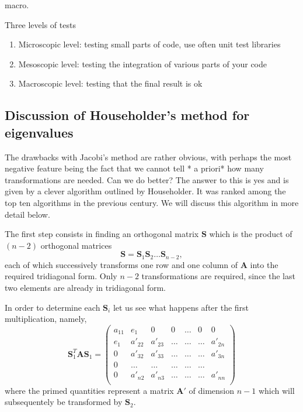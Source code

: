 \documentclass[%
oneside,                 %
final,                   %
10pt]{article}
\begin{document}
macro.

Three levels of tests
\begin{enumerate}
\item Microscopic level: testing small parts of code, use often unit test libraries

\item Mesoscopic level: testing the integration of various parts  of your code

\item Macroscopic level: testing that the final result is ok
\end{enumerate}

\noindent
\subsection*{Discussion of Householder's method for eigenvalues}

The drawbacks with Jacobi's method are rather obvious, with perhaps the most negative feature being the fact that we cannot tell * a priori* how many transformations are needed. Can we do better?  
The answer to this is yes and is given by a clever algorithm outlined by Householder. It was ranked among the top ten algorithms in the previous century.  We will discuss this algorithm in more detail below.

The first step  consists in finding
an orthogonal  matrix $\mathbf{S}$ which is the product of $(n-2)$ orthogonal matrices 
\[ 
   \mathbf{S}=\mathbf{S}_1\mathbf{S}_2\dots\mathbf{S}_{n-2},
\]
each of which successively transforms one row and one column of $\mathbf{A}$ into the 
required tridiagonal form. Only $n-2$ transformations are required, since the last two
elements are already in tridiagonal form. 

In order to determine each $\mathbf{S}_i$ let us
see what happens after the first multiplication, namely,
\[
    \mathbf{S}_1^T\mathbf{A}\mathbf{S}_1=    \left( \begin{array}{ccccccc} a_{11} & e_1 & 0   & 0    & \dots  &0     & 0 \\
                                e_1 & a'_{22} &a'_{23}  & \dots    & \dots  &\dots &a'_{2n} \\
                                0   & a'_{32} &a'_{33}  & \dots    & \dots  &\dots &a'_{3n} \\
                                0   & \dots &\dots & \dots    & \dots  &\dots & \\
                                0   & a'_{n2} &a'_{n3}  & \dots    & \dots  &\dots &a'_{nn} \\
             \end{array} \right) 
\]
where the primed quantities represent a matrix $\mathbf{A}'$ of dimension
$n-1$ which will subsequentely be transformed by $\mathbf{S}_2$.
\end{document}
